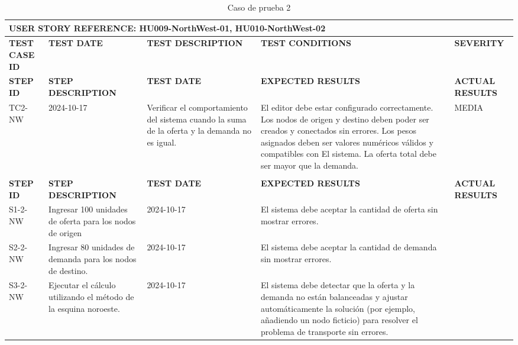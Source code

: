 \documentclass[stu, 12pt, letterpaper, donotrepeattitle, floatsintext, natbib]{apa7}
\begin{document}
\begin{longtable}{|p{2cm}|p{3cm}|p{3cm}|p{3cm}|p{3cm}|}
    \caption{Caso de prueba 2} \label{tab:casos_prueba2} \\
    \hline
    \multicolumn{5}{|l|}{\textbf{USER STORY REFERENCE: HU009-NorthWest-01, HU010-NorthWest-02}} \\ \hline
    \textbf{TEST CASE ID} & \textbf{TEST DATE} & \textbf{TEST DESCRIPTION} & \textbf{TEST CONDITIONS} & \textbf{SEVERITY } \\ \hline
    \endfirsthead
    \hline
    \textbf{STEP ID} & \textbf{STEP DESCRIPTION} & \textbf{TEST DATE} & \textbf{EXPECTED RESULTS} & \textbf{ACTUAL RESULTS} \\ \hline
    \endhead
    TC2-NW & 2024-10-17 & Verificar el comportamiento del sistema cuando la suma de la oferta y la demanda no es igual. & El editor debe estar configurado correctamente. Los nodos de origen y destino deben poder ser creados y conectados sin errores. Los pesos asignados deben ser valores numéricos válidos y compatibles con El sistema. La oferta total debe ser mayor que  la demanda. & MEDIA                                                                                                     \\ \\ \hline
    \textbf{STEP ID} & \textbf{STEP DESCRIPTION} & \textbf{TEST DATE} & \textbf{EXPECTED RESULTS} & \textbf{ACTUAL RESULTS} \\ \hline
    S1-2-NW & Ingresar 100 unidades de oferta para los nodos de origen & 2024-10-17 & El sistema debe aceptar la cantidad de oferta sin mostrar errores. & \\ \hline
    S2-2-NW & Ingresar 80 unidades de demanda para los nodos de destino. & 2024-10-17 & El sistema debe aceptar la cantidad de demanda sin mostrar errores. & \\ \hline
    S3-2-NW & Ejecutar el cálculo utilizando el método de la esquina noroeste. & 2024-10-17 & El sistema debe detectar que la oferta y la demanda no están balanceadas y ajustar automáticamente la solución (por ejemplo, añadiendo un nodo ficticio) para resolver el problema de transporte sin errores. & \\ \hline
\end{longtable}
\end{document}
